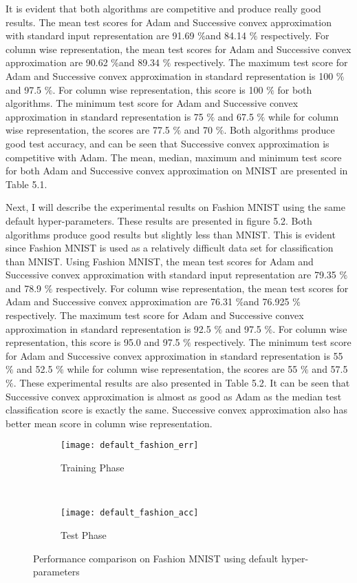 It is evident that both algorithms are competitive and produce really good results. The mean test scores for Adam and Successive convex approximation with standard input representation are 91.69 $\%$and 84.14 $\%$ respectively. For column wise representation, the mean test scores for Adam and Successive convex approximation are 90.62 $\%$and 89.34 $\%$ respectively. The maximum test score for Adam and Successive convex approximation in standard representation is 100 $\%$ and 97.5 $\%$. For column wise representation, this score is 100 $\%$ for both algorithms. The minimum test score for Adam and Successive convex approximation in standard representation is 75 $\%$ and 67.5 $\%$ while for column wise representation, the scores are 77.5 $\%$ and 70 $\%$. Both algorithms produce good test accuracy, and can be seen that Successive convex approximation is competitive with Adam. The mean, median, maximum and minimum test score for both Adam and Successive convex approximation on MNIST are presented in Table 5.1. 

Next, I will describe the experimental results on Fashion MNIST using the same default hyper-parameters. These results are presented in figure 5.2. Both algorithms produce good results but slightly less than MNIST. This is evident since Fashion MNIST is used as a relatively difficult data set for classification than MNIST. Using Fashion MNIST, the mean test scores for Adam and Successive convex approximation with standard input representation are 79.35 $\%$and 78.9 $\%$ respectively. For column wise representation, the mean test scores for Adam and Successive convex approximation are 76.31 $\%$and 76.925 $\%$ respectively. The maximum test score for Adam and Successive convex approximation in standard representation is 92.5 $\%$ and 97.5 $\%$. For column wise representation, this score is 95.0 and 97.5 $\%$ respectively. The minimum test score for Adam and Successive convex approximation in standard representation is 55 $\%$ and 52.5 $\%$ while for column wise representation, the scores are 55 $\%$ and 57.5 $\%$. These experimental results are also presented in Table 5.2. It can be seen that Successive convex approximation is almost as good as Adam as the median test classification score is exactly the same. Successive convex approximation also has better mean score in column wise representation. 


\begin{figure*}[t!]
    \centering
    \begin{subfigure}[t]{0.5\textwidth}
        \centering
        \texttt{[image: default\_fashion\_err]}
        \caption{Training Phase}
    \end{subfigure}%
    ~ 
    \begin{subfigure}[t]{0.5\textwidth}
        \centering
        \texttt{[image: default\_fashion\_acc]}
        \caption{Test Phase}
    \end{subfigure}
    \caption{Performance comparison on Fashion MNIST using default hyper-parameters}
\end{figure*} 



